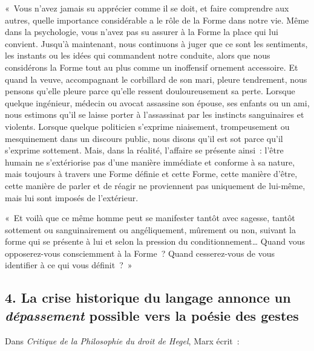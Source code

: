 \documentclass[french,twoside]{book} %
\newenvironment{quoteblock}%
  {\begin{quoting}}
  {\end{quoting}}
\newenvironment{quotebar}{%
    \def\FrameCommand{{\color{rubric!10!}\vrule width 0.5em} \hspace{0.9em}}%
    \def\OuterFrameSep{\itemsep} %
    \MakeFramed {\advance\hsize-\width \FrameRestore}
  }%
  {%
    \endMakeFramed
  }
\renewenvironment{quoteblock}%
  {%
    \savenotes
    \setstretch{0.9}
    \normalfont
    \begin{quotebar}
  }
  {%
    \end{quotebar}
    \spewnotes
  }
\begin{document}
\begin{quoteblock}
 \noindent « Vous n’avez jamais su apprécier comme il se doit, et faire comprendre aux autres, quelle importance considérable a le rôle de la Forme dans notre vie. Même dans la psychologie, vous n’avez pas su assurer à la Forme la place qui lui convient. Jusqu’à maintenant, nous continuons à juger que ce sont les sentiments, les instants ou les idées qui commandent notre conduite, alors que nous considérons la Forme tout au plus comme un inoffensif ornement accessoire. Et quand la veuve, accompagnant le corbillard de son mari, pleure tendrement, nous pensons qu’elle pleure parce qu’elle ressent douloureusement sa perte. Lorsque quelque ingénieur, médecin ou avocat assassine son épouse, ses enfants ou un ami, nous estimons qu’il se laisse porter à l’assassinat par les instincts sanguinaires et violents. Lorsque quelque politicien s’exprime niaisement, trompeusement ou mesquinement dans un discours public, nous disons qu’il est sot parce qu’il s’exprime sottement. Mais, dans la réalité, l’affaire se présente ainsi : l’être humain ne s’extériorise pas d’une manière immédiate et conforme à sa nature, mais toujours à travers une Forme définie et cette Forme, cette manière d’être, cette manière de parler et de réagir ne proviennent pas uniquement de lui-même, mais lui sont imposés de l’extérieur.\par
 
\begin{quoteblock}
\noindent « Et voilà que ce même homme peut se manifester tantôt avec sagesse, tantôt sottement ou sanguinairement ou angéliquement, mûrement ou non, suivant la forme qui se présente à lui et selon la pression du conditionnement… Quand vous opposerez-vous consciemment à la Forme ? Quand cesserez-vous de vous identifier à ce qui vous définit ? »\end{quoteblock}

 \end{quoteblock}

\subsection[{4. La crise historique du langage annonce un dépassement possible vers la poésie des gestes}]{\textsc{4.} La crise historique du langage annonce un \emph{dépassement} possible vers la poésie des gestes}
\noindent Dans \emph{Critique de la Philosophie du droit de Hegel}, Marx écrit :\par
\end{document}
